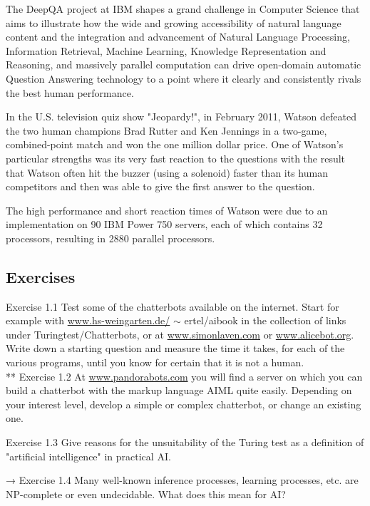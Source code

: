 \documentclass[10pt]{article}
\begin{document}
\begin{displayquote}
The DeepQA project at IBM shapes a grand challenge in Computer Science that aims to illustrate how the wide and growing accessibility of natural language content and the integration and advancement of Natural Language Processing, Information Retrieval, Machine Learning, Knowledge Representation and Reasoning, and massively parallel computation can drive open-domain automatic Question Answering technology to a point where it clearly and consistently rivals the best human performance.
\end{displayquote}

In the U.S. television quiz show "Jeopardy!", in February 2011, Watson defeated the two human champions Brad Rutter and Ken Jennings in a two-game, combined-point match and won the one million dollar price. One of Watson's particular strengths was its very fast reaction to the questions with the result that Watson often hit the buzzer (using a solenoid) faster than its human competitors and then was able to give the first answer to the question.

The high performance and short reaction times of Watson were due to an implementation on 90 IBM Power 750 servers, each of which contains 32 processors, resulting in 2880 parallel processors.

\subsection*{Exercises}
Exercise 1.1 Test some of the chatterbots available on the internet. Start for example with \href{http://www.hs-weingarten.de/}{www.hs-weingarten.de/} $\sim$ ertel/aibook in the collection of links under Turingtest/Chatterbots, or at \href{http://www.simonlaven.com}{www.simonlaven.com} or \href{http://www.alicebot.org}{www.alicebot.org}. Write down a starting question and measure the time it takes, for each of the various programs, until you know for certain that it is not a human.\\
** Exercise 1.2 At \href{http://www.pandorabots.com}{www.pandorabots.com} you will find a server on which you can build a chatterbot with the markup language AIML quite easily. Depending on your interest level, develop a simple or complex chatterbot, or change an existing one.

Exercise 1.3 Give reasons for the unsuitability of the Turing test as a definition of "artificial intelligence" in practical AI.

→ Exercise 1.4 Many well-known inference processes, learning processes, etc. are NP-complete or even undecidable. What does this mean for AI?
\end{document}
